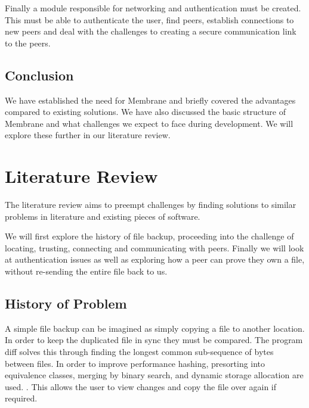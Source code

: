 \documentclass[a4paper, 11pt, twocolumn, twoside]{report}
\begin{document}
Finally a module responsible for networking and authentication must be created. This must be able to authenticate the user, find peers, establish connections to new peers and deal with the challenges to creating a secure communication link to the peers.

\section{Conclusion}

We have established the need for Membrane and briefly covered the advantages compared to existing solutions. We have also discussed the basic structure of Membrane and what challenges we expect to face during development. We will explore these further in our literature review.

\chapter{Literature Review}

The literature review aims to preempt challenges by finding solutions to similar problems in literature and existing pieces of software.

We will first explore the history of file backup, proceeding into the challenge of locating, trusting, connecting and communicating with peers. Finally we will look at authentication issues as well as exploring how a peer can prove they own a file, without re-sending the entire file back to us.

\section{History of Problem}

A simple file backup can be imagined as simply copying a file to another location. In order to keep the duplicated file in sync they must be compared. The program diff solves this through finding the longest common sub-sequence of bytes between files. In order to improve performance hashing, presorting into equivalence classes, merging by binary search, and dynamic storage allocation are used. \citep{hunt1976algorithm}. This allows the user to view changes and copy the file over again if required.
\end{document}
